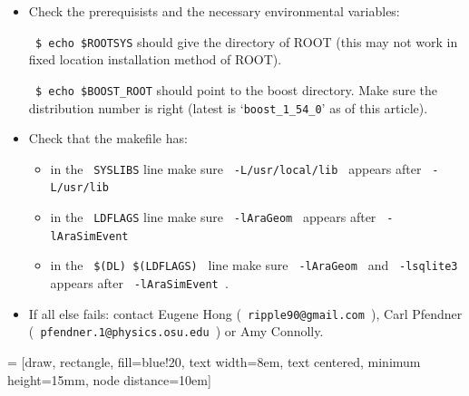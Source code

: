 \documentclass[a4paper,10pt]{article}
\begin{document}
\begin{itemize}

 \item Check the prerequisists and the necessary environmental variables:
 
 \verb| $ echo $ROOTSYS| should give the directory of ROOT (this may not work in fixed location installation method of ROOT). 
 
 \verb| $ echo $BOOST_ROOT| should point to the boost directory. Make sure the distribution number is right (latest is `\verb|boost_1_54_0|' as of this article). 
 
 \pagebreak
 
 \item Check that the makefile has:
 
 \begin{itemize}
 
 \item in the \verb| SYSLIBS| line make sure \verb| -L/usr/local/lib | appears after \verb| -L/usr/lib| 
 
 \item in the \verb| LDFLAGS| line make sure \verb| -lAraGeom | appears after \verb| -lAraSimEvent|
 
 \item in the \verb| $(DL) $(LDFLAGS) | line make sure \verb| -lAraGeom | and \verb| -lsqlite3 | appears after \verb| -lAraSimEvent |. 
 
 \end{itemize}
 
 \item If all else fails: contact Eugene Hong (\verb| ripple90@gmail.com |), Carl Pfendner\\ (\verb| pfendner.1@physics.osu.edu |) or Amy Connolly. 
 
\end{itemize}



 = [draw, rectangle, fill=blue!20, text width=8em, text centered, minimum height=15mm, node distance=10em]
\end{document}
